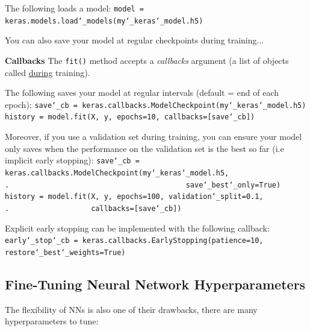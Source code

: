 The following loads a model:\newline
\texttt{model = keras.models.load\char`_models(\textquotesingle my\char`_keras\char`_model.h5\textquotesingle)}

You can also save your model at regular checkpoints during training...

\newpage
\textbf{Callbacks}\newline
The \texttt{fit()} method accepts a \textit{callbacks} argument
(a list of objects called \underline{during} training).

The following saves your model at regular intervals (default = end of each epoch):\newline
\texttt{save\char`_cb = keras.callbacks.ModelCheckpoint(\textquotesingle my\char`_keras\char`_model.h5\textquotesingle)}\newline
\texttt{history = model.fit(X, y, epochs=10, callbacks=[save\char`_cb])}

Moreover, if you use a validation set during training,
you can ensure your model only saves when the performance on the validation set is the best so far (i.e implicit early stopping):
\texttt{save\char`_cb = keras.callbacks.ModelCheckpoint(\textquotesingle my\char`_keras\char`_model.h5\textquotesingle,\newline
.~~~~~~~~~~~~~~~~~~~~~~~~~~~~~~~~~~~~~~~~~save\char`_best\char`_only=True)}\newline
\texttt{history = model.fit(X, y, epochs=100, validation\char`_split=0.1,\newline
.~~~~~~~~~~~~~~~~~~~callbacks=[save\char`_cb])}

Explicit early stopping can be implemented with the following callback:\newline
\texttt{early\char`_stop\char`_cb = \newline keras.callbacks.EarlyStopping(patience=10, restore\char`_best\char`_weights=True)}

\subsection{Fine-Tuning Neural Network Hyperparameters}

The flexibility of NNs is also one of their drawbacks,
there are many hyperparameters to tune:

